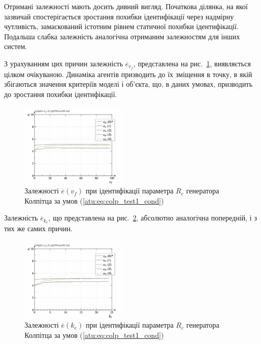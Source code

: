 Отримані залежності мають досить дивний вигляд. Початкова
ділянка, на якої зазвичай спостерігається зростання похибки
ідентифікації через надмірну чутливість, замаскований істотним
рівнем статичної похибки ідентифікації. Подальша слабка
залежність аналогічна отриманим залежностям для інших систем.

З урахуванням цих причин залежність
$\overline{e}_{v_f} $, представлена на рис.~\ref{atu:f:colp_real_id_p_v_f_d_0},
виявляється цілком очікуваною. Динаміка агентів призводить
до їх зміщення в точку, в якій збігаються значення критеріїв
моделі і об'єкта, що, в даних умовах, призводить до зростання
похибки ідентифікації.

\begin{figure}[htb!]
  \centerline{\includegraphics[width=0.45\textwidth]{p/r/colp_real_id-p_v_f_d_0.png} }
\caption{Залежності $ \overline{e} (v_f) $ при ідентифікації параметра $ R_c $ генератора Колпітца за умов (\ref{atu:eq:colp_test1_cond})}
  \label{atu:f:colp_real_id_p_v_f_d_0}
\end{figure}

Залежність
$\overline{e}_{k_e} $, що представлена на рис.~\ref{atu:f:colp_real_id_p_k_e_d_0},
абсолютно аналогічна попередній, і з тих же самих причин.

\begin{figure}[htb!]
  \centerline{\includegraphics[width=0.45\textwidth]{p/r/colp_real_id-p_k_e_d_0.png} }
\caption{Залежності $ \overline{e} (k_e) $ при ідентифікації параметра $ R_c $ генератора Колпітца за умов (\ref{atu:eq:colp_test1_cond})}
\label{atu:f:colp_real_id_p_k_e_d_0}
\end{figure}


